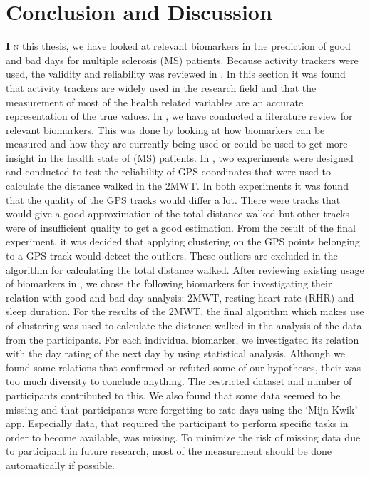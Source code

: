 
\chapter{Conclusion and Discussion}\label{chapter: Conclusion and Discussion}
\lettrine[lhang = 0.4, findent=-60pt, lines=7]{\textbf{
		\initfamily \fontsize{40mm}{40mm} \selectfont I
		\normalfont}}{n}
this thesis, we have looked at relevant biomarkers in the prediction of good and bad days for multiple sclerosis (MS) patients. 
Because activity trackers were used, the validity and reliability was reviewed in .
In this section it was found that activity trackers are widely used in the research field and that the measurement of most of the health related variables are an accurate representation of the true values.
In , we have conducted a literature review for relevant biomarkers. 
This was done by looking at how biomarkers can be measured and how they are currently being used or could be used to get more insight in the health state of (MS) patients.
In , two experiments were designed and conducted to test the reliability of GPS coordinates that were used to calculate the distance walked in the 2MWT.
In both experiments it was found that the quality of the GPS tracks would differ a lot.
There were tracks that would give a good approximation of the total distance walked but other tracks were of insufficient quality to get a good estimation.
From the result of the final experiment, it was decided that applying clustering on the GPS points belonging to a GPS track would detect the outliers.
These outliers are excluded in the algorithm for calculating the total distance walked.
After reviewing existing usage of biomarkers in , we chose the following biomarkers for investigating their relation with good and bad day analysis: 2MWT, resting heart rate (RHR) and sleep duration.
For the results of the 2MWT, the final algorithm which makes use of clustering was used to calculate the distance walked in the analysis of the data from the participants.
For each individual biomarker, we investigated its relation with the day rating of the next day by using statistical analysis.
Although we found some relations that confirmed or refuted some of our hypotheses, their was too much diversity to conclude anything.
The restricted dataset and number of participants contributed to this. 
We also found that some data seemed to be missing and that participants were forgetting to rate days using the `Mijn Kwik' app.
Especially data, that required the participant to perform specific tasks in order to become available, was missing.
To minimize the risk of missing data due to participant in future research, most of the measurement should be done automatically if possible.

